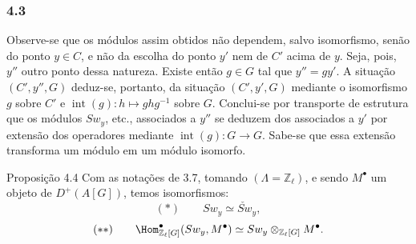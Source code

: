 \subsubsection*{4.3}

Observe-se que os módulos assim obtidos não dependem, salvo isomorfismo, senão do ponto $y\in C$, e não da escolha do ponto $y'$ nem de $C'$ acima de $y$. Seja, pois, $y''$ outro ponto dessa natureza. Existe então $g\in G$ tal que $y''=g y'$. A situação $(C',y'',G)$ deduz-se, portanto, da situação $(C',y',G)$ mediante o isomorfismo $g$ sobre $C'$ e $\operatorname{int}(g):h\mapsto ghg^{-1}$ sobre $G$. Conclui-se por transporte de estrutura que os módulos $Sw_y$, etc., associados a $y''$ se deduzem dos associados a $y'$ por extensão dos operadores mediante $\operatorname{int}(g):G\to G$. Sabe-se que essa extensão transforma um módulo em um módulo isomorfo.

\begin{statement}{Proposição 4.4}
Com as notações de 3.7, tomando $(\Lambda=\mathbb Z_\ell)$, e sendo $M^\bullet$ um objeto de $D^+(A[G])$, temos isomorfismos:
\[
(*)\qquad Sw_y\simeq \check{Sw}_y,
\]
\[
(**)\qquad
\Hom^\bullet_{\mathbb Z_\ell[G]}(Sw_y,M^\bullet)
\simeq Sw_y\otimes_{\mathbb Z_\ell[G]}M^\bullet.
\]
\end{statement}
